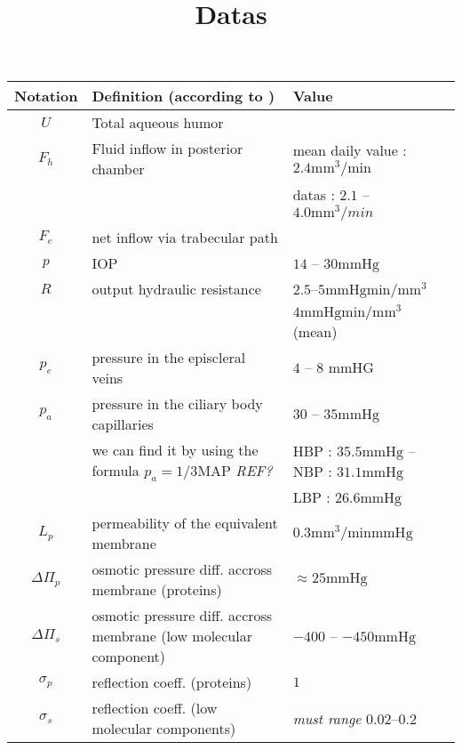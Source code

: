 \documentclass[11pt]{article}
\author{}
\title{Datas}
\date{}
\begin{document}
\maketitle
\begin{center}
\begin{tabular}{|c|p{}|l|}
\hline
Notation & Definition (according to \cite{lyubimov2007dynamics}) & Value \\
\hline
\hline
$U$ & Total aqueous humor & \\
\hline
$F_h$ & Fluid inflow in posterior chamber & mean daily value : $2.4 \mathrm{mm}^3/\mathrm{min}$ \\
&& datas : $2.1$ -- $4.0 \mathrm{mm}^3/min$\\
\hline
$F_e$ & net inflow via trabecular path & \\
 \hline
 $p$ & IOP & $14$ -- $30 \mathrm{mmHg}$\\
 \hline
 $R$ & output hydraulic resistance & $2.5$--$5 \mathrm{mmHgmin}/\mathrm{mm}^3$ \cite{lyubimov2007dynamics}\\
 && $4\mathrm{mmHgmin}/\mathrm{mm}^3$ (mean) \cite{bill1975blood}\\
 \hline
 $p_e$ & pressure in the episcleral veins & $4$ -- $8$ $\mathrm{mmHG} $\\
 \hline
 $p_a$ & pressure in the ciliary body capillaries & $30$ -- $35 \mathrm{mmHg}$ \cite{lyubimov2007dynamics}\\
 &we can find it by using the formula $p_a = 1/3 \mathrm{MAP} $ \textit{REF?} & HBP : $35.5 \mathrm{mmHg} $ -- NBP : $31.1\mathrm{mmHg}$  \\
 && LBP : $26.6\mathrm{mmHg}$\\
 \hline
 $L_p$ & permeability of the equivalent membrane & $0.3 \mathrm{mm^3}/\mathrm{minmmHg}$\\
 \hline
 $\Delta \Pi_p $& osmotic pressure diff. accross membrane (proteins) &$\approx 25 \mathrm{mmHg}$\\
 \hline
 $\Delta \Pi_s $&osmotic pressure diff. accross membrane (low molecular component)& $-400$ -- $-450 \mathrm{mmHg}$\\
 \hline
 $\sigma_p$ &reflection coeff. (proteins) & $1$ \\
 \hline
 $\sigma_s$ & reflection coeff. (low molecular components) & \textit{must range} $0.02$--$0.2$ \\

\end{tabular}
\end{center}
\end{document}
